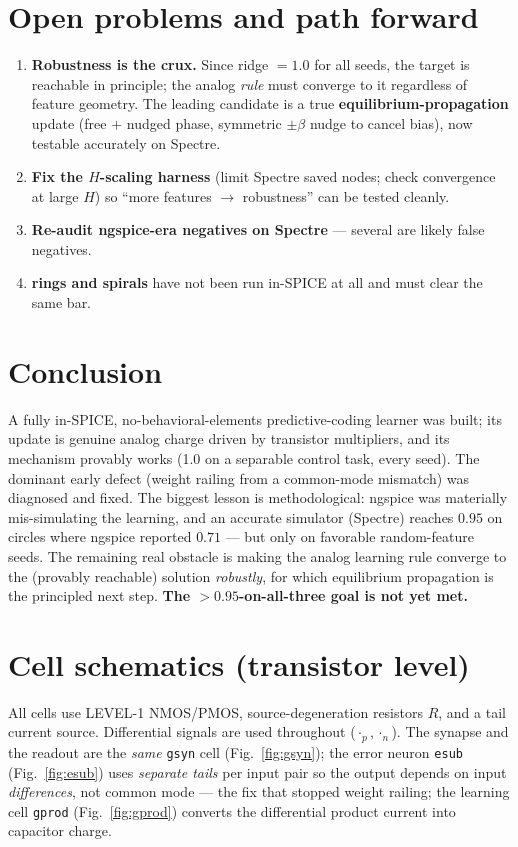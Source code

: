 \documentclass[11pt]{article}
\begin{document}
\section{Open problems and path forward}
\begin{enumerate}\setlength\itemsep{1pt}
\item \textbf{Robustness is the crux.} Since ridge $=1.0$ for all seeds, the target is
reachable in principle; the analog \emph{rule} must converge to it regardless of feature
geometry. The leading candidate is a true \textbf{equilibrium-propagation} update (free
$+$ nudged phase, symmetric $\pm\beta$ nudge to cancel bias), now testable accurately on
Spectre.
\item \textbf{Fix the $H$-scaling harness} (limit Spectre saved nodes; check convergence
at large $H$) so ``more features $\to$ robustness'' can be tested cleanly.
\item \textbf{Re-audit ngspice-era negatives on Spectre} --- several are likely false
negatives.
\item \textbf{rings and spirals} have not been run in-SPICE at all and must clear the
same bar.
\end{enumerate}

\section{Conclusion}
A fully in-SPICE, no-behavioral-elements predictive-coding learner was built; its update
is genuine analog charge driven by transistor multipliers, and its mechanism provably
works (1.0 on a separable control task, every seed). The dominant early defect (weight
railing from a common-mode mismatch) was diagnosed and fixed. The biggest lesson is
methodological: ngspice was materially mis-simulating the learning, and an accurate
simulator (Spectre) reaches $0.95$ on circles where ngspice reported $0.71$ --- but only
on favorable random-feature seeds. The remaining real obstacle is making the analog
learning rule converge to the (provably reachable) solution \emph{robustly}, for which
equilibrium propagation is the principled next step. \textbf{The $>0.95$-on-all-three
goal is not yet met.}

\appendix
\section{Cell schematics (transistor level)}
\label{app:cells}
All cells use LEVEL-1 NMOS/PMOS, source-degeneration resistors $R$, and a tail current
source. Differential signals are used throughout ($\cdot_p,\cdot_n$). The synapse and the
readout are the \emph{same} \texttt{gsyn} cell (Fig.~\ref{fig:gsyn}); the error neuron
\texttt{esub} (Fig.~\ref{fig:esub}) uses \emph{separate tails} per input pair so the
output depends on input \emph{differences}, not common mode --- the fix that stopped weight
railing; the learning cell \texttt{gprod} (Fig.~\ref{fig:gprod}) converts the differential
product current into capacitor charge.
\end{document}
